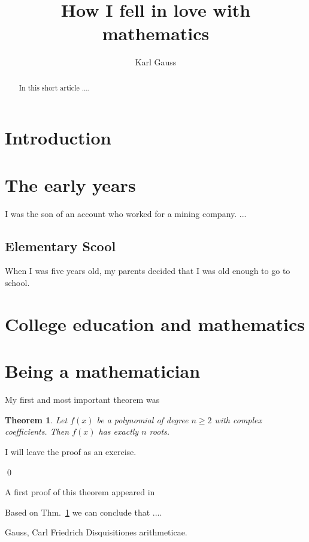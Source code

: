 \documentclass[12pt]{amsart}
\title{How I fell in love with mathematics}
\author{Karl Gauss}
\date{} %
\newtheorem{thm}{Theorem}
\begin{document}
\begin{abstract}
In this short article ....
\end{abstract}


\maketitle
\tableofcontents

\section{Introduction}


\section{The early years}

I was the son of an account who worked for a mining company. ...


\subsection{Elementary Scool}

When I was five years old, my parents decided that I was old enough to go to school. 




\section{College education and mathematics}




\section{Being a mathematician}


My first and most important theorem was 

\begin{thm}\label{thm-1}
Let $f(x)$ be a polynomial of degree $n\geq 2$ with complex coefficients.  Then $f(x)$ has exactly $n$ roots. 
\end{thm}

\proof
I will leave the proof as an exercise. 


\qed

A first proof of this theorem appeared in \cite{gauss-1}

Based on Thm.~\ref{thm-1} we can conclude that .... 

\begin{thebibliography}{50}

 
 Gauss, Carl Friedrich
Disquisitiones arithmeticae.

\end{thebibliography}
\end{document}
